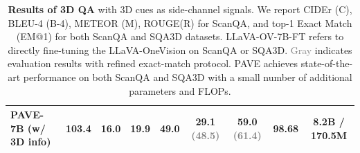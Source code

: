\begin{table}[t]
{\begin{tabular}{lccccc|c|c|c}
     PAVE-7B   (w/ 3D info)                                       & \textbf{103.4} & \textbf{16.0} & 19.9 & 49.0 & \textbf{29.1} \textcolor{gray}{(48.5)} & \textbf{59.0} \textcolor{gray}{(61.4)} & 98.68 & 8.2B / 170.5M\\ \bottomrule
     

\end{tabular}
}
\vspace{-1mm}
\caption{\textbf{Results of 3D QA} with 3D cues as side-channel signals. We report CIDEr (C), BLEU-4 (B-4), METEOR (M), ROUGE(R) for ScanQA, and top-1 Exact Match (EM@1) for both ScanQA and SQA3D datasets. LLaVA-OV-7B-FT refers to directly fine-tuning the LLaVA-OneVision on ScanQA or SQA3D. \textcolor{gray}{Gray} indicates evaluation results with refined exact-match protocol. PAVE achieves state-of-the-art performance on both ScanQA and SQA3D with a small number of additional parameters and FLOPs.
}  
\vspace{-3mm}
\label{tab:3d_qa_understanding}  
\end{table}  


